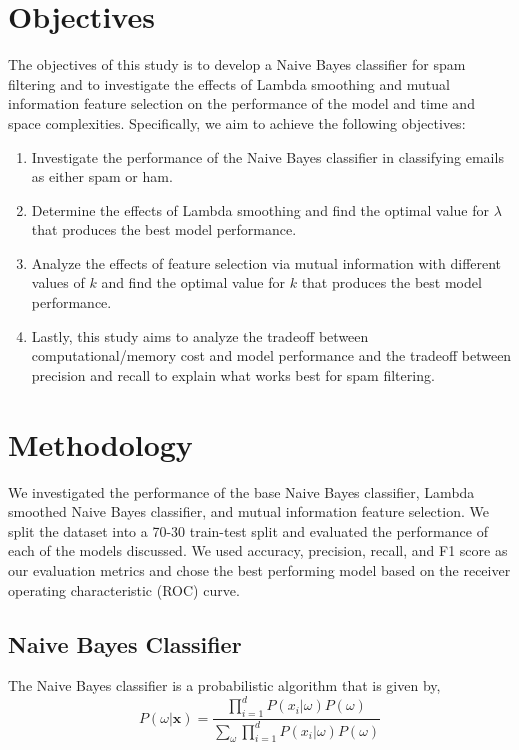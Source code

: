\documentclass{acm_proc_article-sp}
\begin{document}
\section{Objectives}
The objectives of this study is to develop a Naive Bayes classifier for spam filtering and to investigate the effects of Lambda smoothing and mutual information feature selection on the performance of the model and time and space complexities. Specifically, we aim to achieve the following objectives:
\begin{enumerate}
    \item Investigate the performance of the Naive Bayes classifier in classifying emails as either spam or ham.
    \item Determine the effects of Lambda smoothing and find the optimal value for $\lambda$ that produces the best model performance.
    \item Analyze the effects of feature selection via mutual information with different values of $k$ and find the optimal value for $k$ that produces the best model performance.
    \item Lastly, this study aims to analyze the tradeoff between computational/memory cost and model performance and the tradeoff between precision and recall to explain what works best for spam filtering.

\end{enumerate}

\section{Methodology}
We investigated the performance of the base Naive Bayes classifier, Lambda smoothed Naive Bayes classifier, and mutual information feature selection. We split the dataset into a 70-30 train-test split and evaluated the performance of each of the models discussed. We used accuracy, precision, recall, and F1 score as our evaluation metrics and chose the best performing model based on the receiver operating characteristic (ROC) curve.

\subsection{Naive Bayes Classifier}
The Naive Bayes classifier is a probabilistic algorithm that is given by,
\begin{equation}
    P(\omega|\mathbf{x})=\frac{\prod_{i=1}^d{P(x_i|\omega)P(\omega)}}{\sum_\omega\prod_{i=1}^d{P(x_i|\omega)P(\omega)}}
\end{equation}
\end{document}
